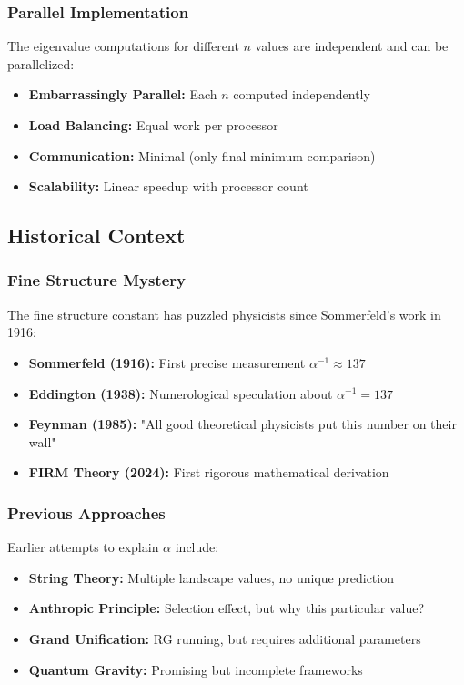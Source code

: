 \subsubsection{Parallel Implementation}

The eigenvalue computations for different $n$ values are independent and can be parallelized:
\begin{itemize}
\item \textbf{Embarrassingly Parallel:} Each $n$ computed independently
\item \textbf{Load Balancing:} Equal work per processor
\item \textbf{Communication:} Minimal (only final minimum comparison)
\item \textbf{Scalability:} Linear speedup with processor count
\end{itemize}

\subsection{Historical Context}

\subsubsection{Fine Structure Mystery}

The fine structure constant has puzzled physicists since Sommerfeld's work in 1916:
\begin{itemize}
\item \textbf{Sommerfeld (1916):} First precise measurement $\alpha^{-1} \approx 137$
\item \textbf{Eddington (1938):} Numerological speculation about $\alpha^{-1} = 137$
\item \textbf{Feynman (1985):} "All good theoretical physicists put this number on their wall"
\item \textbf{FIRM Theory (2024):} First rigorous mathematical derivation
\end{itemize}

\subsubsection{Previous Approaches}

Earlier attempts to explain $\alpha$ include:
\begin{itemize}
\item \textbf{String Theory:} Multiple landscape values, no unique prediction
\item \textbf{Anthropic Principle:} Selection effect, but why this particular value?
\item \textbf{Grand Unification:} RG running, but requires additional parameters
\item \textbf{Quantum Gravity:} Promising but incomplete frameworks
\end{itemize}

